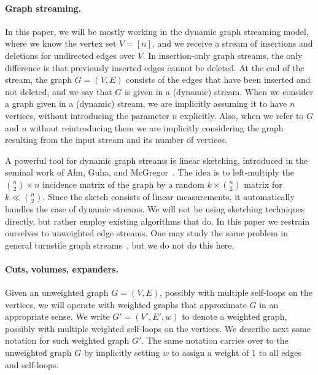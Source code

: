 \paragraph{Graph streaming.} In this paper, we will be mostly working in the dynamic graph streaming model, where we know the vertex set $V=[n]$, and we receive a stream of insertions and deletions for undirected edges over $V$. In insertion-only graph streams, the only difference is that previously inserted edges cannot be deleted. At the end of the stream, the graph $G=(V,E)$ consists of the edges that have been inserted and not deleted, and we say that $G$ is given in a (dynamic) stream. When we consider a graph given in a (dynamic) stream, we are implicitly assuming it to have $n$ vertices, without introducing the parameter $n$ explicitly. Also, when we refer to $G$ and $n$ without reintroducing them we are implicitly considering the graph resulting from the input stream and its number of vertices.

A powerful tool for dynamic graph streams is linear sketching, introduced in the seminal work of Ahn, Guha, and McGregor~\cite{linmeas}. The idea is to left-multiply the $\binom{n}{2} \times n$ incidence matrix of the graph by a random $k \times \binom{n}{2}$ matrix for $k \ll \binom{n}{2}$. Since the sketch consists of linear measurements, it automatically handles the case of dynamic streams. We will not be using sketching techniques directly, but rather employ existing algorithms that do. In this paper we restrain ourselves to unweighted edge streams. One may study the same problem in general turnstile graph streams~\cite{weightedlinearspars}, but we do not do this here.

\paragraph{Cuts, volumes, expanders.} Given an unweighted graph $G=(V, E)$, possibly with multiple self-loops on the vertices, we will operate with weighted graphs that approximate $G$ in an appropriate sense. We write $G'=(V',E', w)$ to denote a weighted graph, possibly with multiple weighted self-loops on the vertices. We describe next some notation for such weighted graph $G'$. The same notation carries over to the unweighted graph $G$ by implicitly setting $w$ to assign a weight of $1$ to all edges and self-loops.

